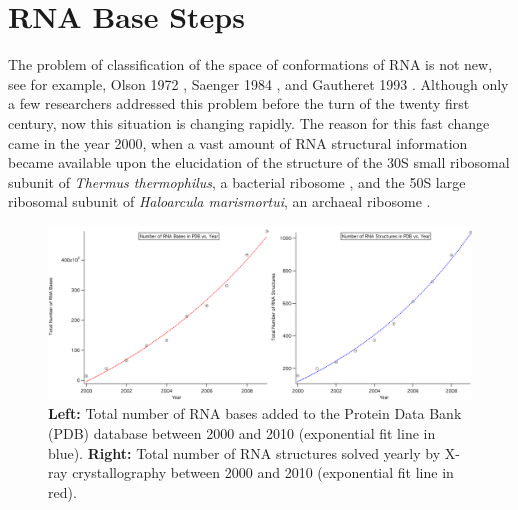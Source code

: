 \chapter{RNA Base Steps}
\label{basesteps} 

The problem of classification of the space of conformations
of RNA  is not  new, see for  example, Olson  1972 \cite{olson1_1972},
Saenger     1984     \cite{saenger1984},     and    Gautheret     1993
\cite{gautheret1993}.  Although only  a few researchers addressed this
problem  before  the  turn  of  the twenty  first  century,  now  this
situation is changing rapidly. The reason for this fast change came in
the year 2000, when a vast amount of RNA structural information became
available  upon the  elucidation of  the  structure of  the 30S  small
ribosomal  subunit  of   \textit{Thermus  thermophilus},  a  bacterial
ribosome  \cite{wimberly2000,  schluenzen2000},   and  the  50S  large
ribosomal subunit of \textit{Haloarcula marismortui}, an archaeal
ribosome \cite{ban2000}.
\begin{figure}[H]
\centering
\includegraphics[scale=0.38]{Chapter2/rna2000_2009copy.png}
\caption{\textbf{Left:} Total number of RNA bases added to the Protein
Data Bank (PDB)  database between 2000 and 2010  (exponential fit line
in blue). \textbf{Right:} Total number of RNA structures solved yearly
by X-ray  crystallography between 2000 and 2010  (exponential fit line
in red).}
\label{fig:rnainpdb}
\end{figure}

